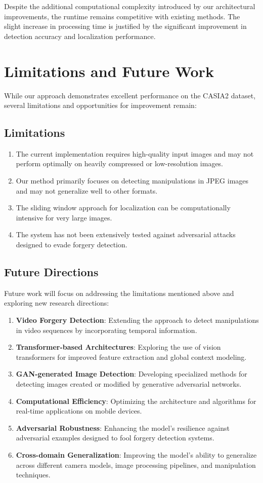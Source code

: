 \documentclass[conference]{IEEEtran}
\begin{document}
Despite the additional computational complexity introduced by our architectural improvements, the runtime remains competitive with existing methods. The slight increase in processing time is justified by the significant improvement in detection accuracy and localization performance.

\section{Limitations and Future Work}
While our approach demonstrates excellent performance on the CASIA2 dataset, several limitations and opportunities for improvement remain:

\subsection{Limitations}
\begin{enumerate}
    \item The current implementation requires high-quality input images and may not perform optimally on heavily compressed or low-resolution images.
    \item Our method primarily focuses on detecting manipulations in JPEG images and may not generalize well to other formats.
    \item The sliding window approach for localization can be computationally intensive for very large images.
    \item The system has not been extensively tested against adversarial attacks designed to evade forgery detection.
\end{enumerate}

\subsection{Future Directions}
Future work will focus on addressing the limitations mentioned above and exploring new research directions:

\begin{enumerate}
    \item \textbf{Video Forgery Detection}: Extending the approach to detect manipulations in video sequences by incorporating temporal information.
    \item \textbf{Transformer-based Architectures}: Exploring the use of vision transformers for improved feature extraction and global context modeling.
    \item \textbf{GAN-generated Image Detection}: Developing specialized methods for detecting images created or modified by generative adversarial networks.
    \item \textbf{Computational Efficiency}: Optimizing the architecture and algorithms for real-time applications on mobile devices.
    \item \textbf{Adversarial Robustness}: Enhancing the model's resilience against adversarial examples designed to fool forgery detection systems.
    \item \textbf{Cross-domain Generalization}: Improving the model's ability to generalize across different camera models, image processing pipelines, and manipulation techniques.
\end{enumerate}
\end{document}
